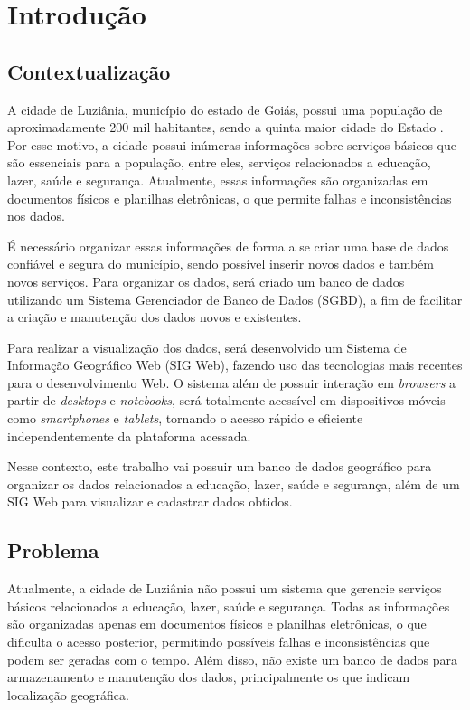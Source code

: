 \chapter{Introdução}
\label{cap:intro}

\section{Contextualização}

A cidade de Luziânia, município do estado de Goiás, possui uma população de aproximadamente 200 mil habitantes, sendo a quinta maior cidade do Estado \cite{luziania}. Por esse motivo, a cidade possui inúmeras informações sobre serviços básicos que são essenciais para a população, entre eles, serviços relacionados a educação, lazer, saúde e segurança. Atualmente, essas informações são organizadas em documentos físicos e planilhas eletrônicas, o que permite falhas e inconsistências nos dados.

É necessário organizar essas informações de forma a se criar uma base de dados confiável e segura do município, sendo possível inserir novos dados e também novos serviços. Para organizar os dados, será criado um banco de dados utilizando um Sistema Gerenciador de Banco de Dados (SGBD), a fim de facilitar a criação e manutenção dos dados novos e existentes.

Para realizar a visualização dos dados, será desenvolvido um Sistema de Informação Geográfico Web (SIG Web), fazendo uso das tecnologias mais recentes para o desenvolvimento Web. O sistema além de possuir interação em \textit{browsers} a partir de \textit{desktops} e \textit{notebooks}, será totalmente acessível em dispositivos móveis como \textit{smartphones} e \textit{tablets}, tornando o acesso rápido e eficiente independentemente da plataforma acessada.

Nesse contexto, este trabalho vai possuir um banco de dados geográfico para organizar os dados relacionados a educação, lazer, saúde e segurança, além de um SIG Web para visualizar e cadastrar dados obtidos.

\section{Problema}

Atualmente, a cidade de Luziânia não possui um sistema que gerencie serviços básicos relacionados a educação, lazer, saúde e segurança. Todas as informações são organizadas apenas em documentos físicos e planilhas eletrônicas, o que dificulta o acesso posterior, permitindo possíveis falhas e inconsistências que podem ser geradas com o tempo. Além disso, não existe um banco de dados para armazenamento e manutenção dos dados, principalmente os que indicam localização geográfica.


